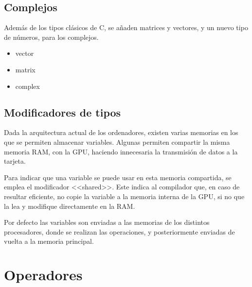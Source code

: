 \documentclass[12pt,a4paper]{article}
\begin{document}
\subsection
{Complejos}

Además de los tipos clásicos de C, se añaden matrices y vectores, y un nuevo 
tipo de números, para los complejos.

\begin{itemize}
\item vector
\item matrix
\item complex
\end{itemize}

\subsection
{Modificadores de tipos}

Dada la arquitectura actual de los ordenadores, existen varias memorias en los 
que se permiten almacenar variables. Algunas permiten compartir la misma memoria 
RAM, con la GPU, haciendo innecesaria la transmisión de datos a la tarjeta.

Para indicar que una variable se puede usar en esta memoria compartida, se 
emplea el modificador <<shared>>. Este indica al compilador que, en caso de 
resultar eficiente, no copie la variable a la memoria interna de la GPU, si no 
que la lea y modifique directamente en la RAM.

Por defecto las variables son enviadas a las memorias de los distintos 
procesadores, donde se realizan las operaciones, y posteriormente enviadas de 
vuelta a la memoria principal.



\section{Operadores}
\end{document}
